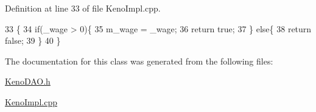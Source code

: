 Definition at line 33 of file Keno\+Impl.\+cpp.


\begin{DoxyCode}
33                             \{
34     \textcolor{keywordflow}{if}(\_wage > 0)\{
35         m\_wage = \_wage;
36         \textcolor{keywordflow}{return} \textcolor{keyword}{true};
37     \} \textcolor{keywordflow}{else}\{
38         \textcolor{keywordflow}{return} \textcolor{keyword}{false};
39     \}
40 \}
\end{DoxyCode}


The documentation for this class was generated from the following files\+:\begin{DoxyCompactItemize}
\item 
\hyperlink{_keno_d_a_o_8h}{Keno\+D\+A\+O.\+h}\item 
\hyperlink{_keno_impl_8cpp}{Keno\+Impl.\+cpp}\end{DoxyCompactItemize}
